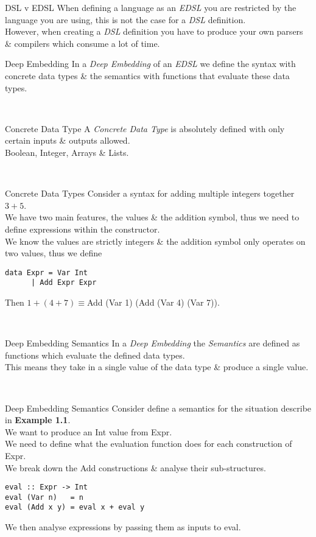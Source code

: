 \documentclass[11pt,a4paper]{article}
\begin{document}
\begin{remark}{DSL v EDSL}
When defining a language as an \textit{EDSL} you are restricted by the language you are using, this is not the case for a \textit{DSL} definition.\\
However, when creating a \textit{DSL} definition you have to produce your own parsers \& compilers which consume a lot of time.
\end{remark}

\begin{definition}{Deep Embedding}
In a \textit{Deep Embedding} of an \textit{EDSL} we define the syntax with concrete data types \& the semantics with functions that evaluate these data types.
\end{definition}\\

\begin{definition}{Concrete Data Type}
A \textit{Concrete Data Type} is absolutely defined with only certain inputs \& outputs allowed.\\
\EG Boolean, Integer, Arrays \& Lists.
\end{definition}\\

\begin{example}{Concrete Data Types}
Consider a syntax for adding multiple integers together \eg $3+5$.\\
We have two main features, the values \& the addition symbol, thus we need to define expressions within the constructor.\\
We know the values are strictly integers \& the addition symbol only operates on two values, thus we define
\begin{lstlisting}
data Expr = Var Int
	  | Add Expr Expr
\end{lstlisting}
Then $1+(4+7)\equiv$Add (Var 1) (Add (Var 4) (Var 7)).
\end{example}\\

\begin{definition}{Deep Embedding Semantics}
In a \textit{Deep Embedding} the \textit{Semantics} are defined as functions which evaluate the defined data types.\\
This means they take in a single value of the data type \& produce a single value.
\end{definition}\\

\begin{example}{Deep Embedding Semantics}
Consider define a semantics for the situation describe in \textbf{Example 1.1}.\\
We want to produce an Int value from Expr.\\
We need to define what the evaluation function does for each construction of Expr.\\
We break down the Add constructions \& analyse their sub-structures.
\begin{lstlisting}
eval :: Expr -> Int
eval (Var n)   = n
eval (Add x y) = eval x + eval y
\end{lstlisting}
We then analyse expressions by passing them as inputs to eval.
\end{example}
\end{document}
